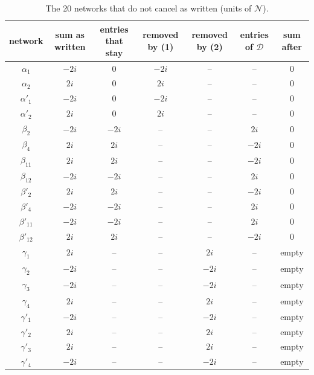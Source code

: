 \documentclass[10pt]{article}
\numberwithin{equation}{section}
\newcommand{\NN}{\mathcal N}
\begin{document}
\begin{table}[h]
\centering\small
\begin{tabular}{@{}c c c c c c c@{}}
network & sum as written & entries that stay & removed by (1) & removed by (2) & entries of $\mathcal D$ & sum after\\ \hline
$\alpha_{1}$ & $-2i$ & $0$ & $-2i$ & $\text{--}$ & $\text{--}$ & $0$\\
$\alpha_{2}$ & $2i$ & $0$ & $2i$ & $\text{--}$ & $\text{--}$ & $0$\\
$\alpha'_{1}$ & $-2i$ & $0$ & $-2i$ & $\text{--}$ & $\text{--}$ & $0$\\
$\alpha'_{2}$ & $2i$ & $0$ & $2i$ & $\text{--}$ & $\text{--}$ & $0$\\
$\beta_{2}$ & $-2i$ & $-2i$ & $\text{--}$ & $\text{--}$ & $2i$ & $0$\\
$\beta_{4}$ & $2i$ & $2i$ & $\text{--}$ & $\text{--}$ & $-2i$ & $0$\\
$\beta_{11}$ & $2i$ & $2i$ & $\text{--}$ & $\text{--}$ & $-2i$ & $0$\\
$\beta_{12}$ & $-2i$ & $-2i$ & $\text{--}$ & $\text{--}$ & $2i$ & $0$\\
$\beta'_{2}$ & $2i$ & $2i$ & $\text{--}$ & $\text{--}$ & $-2i$ & $0$\\
$\beta'_{4}$ & $-2i$ & $-2i$ & $\text{--}$ & $\text{--}$ & $2i$ & $0$\\
$\beta'_{11}$ & $-2i$ & $-2i$ & $\text{--}$ & $\text{--}$ & $2i$ & $0$\\
$\beta'_{12}$ & $2i$ & $2i$ & $\text{--}$ & $\text{--}$ & $-2i$ & $0$\\
$\gamma_{1}$ & $2i$ & $\text{--}$ & $\text{--}$ & $2i$ & $\text{--}$ & $\text{empty}$\\
$\gamma_{2}$ & $-2i$ & $\text{--}$ & $\text{--}$ & $-2i$ & $\text{--}$ & $\text{empty}$\\
$\gamma_{3}$ & $-2i$ & $\text{--}$ & $\text{--}$ & $-2i$ & $\text{--}$ & $\text{empty}$\\
$\gamma_{4}$ & $2i$ & $\text{--}$ & $\text{--}$ & $2i$ & $\text{--}$ & $\text{empty}$\\
$\gamma'_{1}$ & $-2i$ & $\text{--}$ & $\text{--}$ & $-2i$ & $\text{--}$ & $\text{empty}$\\
$\gamma'_{2}$ & $2i$ & $\text{--}$ & $\text{--}$ & $2i$ & $\text{--}$ & $\text{empty}$\\
$\gamma'_{3}$ & $2i$ & $\text{--}$ & $\text{--}$ & $2i$ & $\text{--}$ & $\text{empty}$\\
$\gamma'_{4}$ & $-2i$ & $\text{--}$ & $\text{--}$ & $-2i$ & $\text{--}$ & $\text{empty}$\\
\end{tabular}
\caption{The 20 networks that do not cancel as written (units of $\NN$).}
\label{tab:diag}
\end{table}
\end{document}
